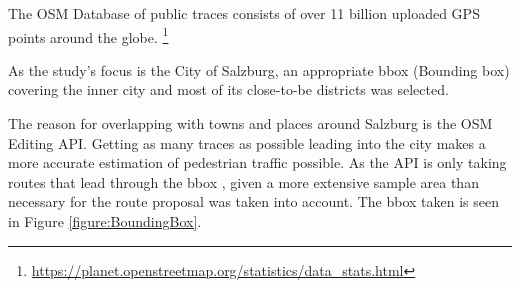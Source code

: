 %
%
%

The OSM Database of public traces consists of over 11 billion uploaded GPS points around the globe. \footnote{\url{https://planet.openstreetmap.org/statistics/data_stats.html}}

As the study's focus is the City of Salzburg, an appropriate bbox (Bounding box) covering the inner city and most of its close-to-be districts was selected. 

The reason for overlapping with towns and places around Salzburg is the OSM Editing API. Getting as many traces as possible leading into the city makes a more accurate estimation of pedestrian traffic possible. As the API is only taking routes that lead through the bbox , given a more extensive sample area than necessary for the route proposal was taken into account. The bbox taken is seen in Figure \ref{figure:BoundingBox}.


